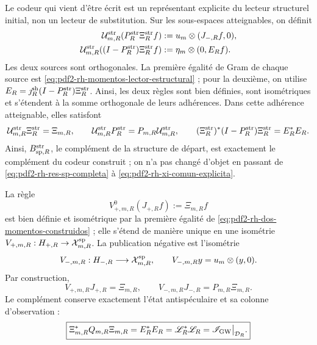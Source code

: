 Le codeur qui vient d'être écrit est un représentant explicite du lecteur
structurel initial, non un lecteur de substitution. Sur les sous-espaces atteignables, on
définit
\begin{equation}\label{eq:pdf2-rh-isomorfismo-lector-estructural}
\begin{aligned}
 \mathcal U_{m,R}^{\rm str}
  (P_R^{\rm str}\Xi_R^{\rm str}f)
   &:=u_m\otimes(J_{-,R}f,0),\\
 \mathcal U_{m,R}^{\rm str}
  ((I-P_R^{\rm str})\Xi_R^{\rm str}f)
   &:=\eta_m\otimes(0,E_Rf).
\end{aligned}
\end{equation}
Les deux sources sont orthogonales. La première égalité de Gram de chaque source
est \eqref{eq:pdf2-rh-momentos-lector-estructural} ; pour la deuxième, on utilise
\(E_R=\jmath_R^{\rm sh}(I-P_R^{\rm str})\Xi_R^{\rm str}\). Ainsi, les deux
règles sont bien définies, sont isométriques et s'étendent à la somme orthogonale
de leurs adhérences. Dans cette adhérence atteignable, elles satisfont
\begin{equation}\label{eq:pdf2-rh-entrelazamiento-lector-estructural}
 \mathcal U_{m,R}^{\rm str}\Xi_R^{\rm str}=\Xi_{m,R},
 \qquad
 \mathcal U_{m,R}^{\rm str}P_R^{\rm str}
 =P_{m,R}\mathcal U_{m,R}^{\rm str},
 \qquad
 (\Xi_R^{\rm str})^*(I-P_R^{\rm str})\Xi_R^{\rm str}=E_R^*E_R.
\end{equation}
Ainsi, \(B_{{\rm sp},R}^{\rm str}\), le complément de la structure de
départ, est exactement le complément du codeur construit ; on n'a pas
changé d'objet en passant de \eqref{eq:pdf2-rh-res-sp-completa} à
\eqref{eq:pdf2-rh-xi-comun-explicita}.

La règle
\begin{equation}\label{eq:pdf2-rh-vmas-rango}
 V_{+,m,R}^{0}(J_{+,R}f):=\Xi_{m,R}f
\end{equation}
est bien définie et isométrique par la première égalité de
\eqref{eq:pdf2-rh-dos-momentos-construidos} ; elle s'étend de manière unique en
une isométrie
\(V_{+,m,R}:H_{+,R}\to\mathcal X_{m,R}^{\rm sp}\). La publication négative
est l'isométrie
\begin{equation}\label{eq:pdf2-rh-vmenos}
 V_{-,m,R}:H_{-,R}\longrightarrow\mathcal X_{m,R}^{\rm sp},
 \qquad V_{-,m,R}y=u_m\otimes(y,0).
\end{equation}
Par construction,
\begin{equation}\label{eq:pdf2-rh-doble-publicacion-material}
 \boxed{
 V_{+,m,R}J_{+,R}=\Xi_{m,R},
 \qquad
 V_{-,m,R}J_{-,R}=P_{m,R}\Xi_{m,R}.}
\end{equation}
Le complément conserve exactement l'état antispéculaire et sa colonne
d'observation :
\begin{equation}\label{eq:pdf2-rh-complemento-comun}
 \boxed{
 \Xi_{m,R}^*Q_{m,R}\Xi_{m,R}
 =E_R^*E_R
 =\mathscr L_R^*\mathscr L_R
 =\mathscr I_{\rm GW}\big|_{\mathcal D_R}.}
\end{equation}

